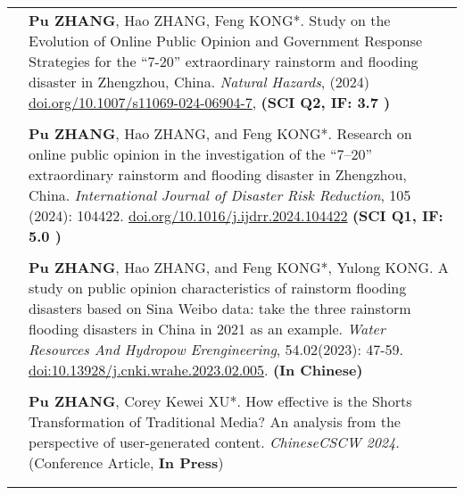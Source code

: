\documentclass[letterpaper, 11pt]{article}
\begin{document}
\begin{longtable}{p{1.3in}p{4.8in}}

\nohyphens{\color{RoyalBlue}{Publications}} 

& \textbf{Pu ZHANG}, Hao ZHANG, Feng KONG*. Study on the Evolution of Online Public Opinion and Government Response Strategies for the “7-20” extraordinary rainstorm and flooding disaster in Zhengzhou, China. \textit{Natural Hazards}, (2024) \href{https://doi.org/10.1007/s11069-024-06904-7}{doi.org/10.1007/s11069-024-06904-7}, \bf(SCI Q2, IF: 3.7 )\\
&\\
& \textbf{Pu ZHANG}, Hao ZHANG, and Feng KONG*. Research on online public opinion in the investigation of the “7–20” extraordinary rainstorm and flooding disaster in Zhengzhou, China. \textit{International Journal of Disaster Risk Reduction}, { 105 (2024): 104422.} \href{https://doi.org/10.1016/j.ijdrr.2024.104422}{doi.org/10.1016/j.ijdrr.2024.104422} \bf(SCI Q1, IF: 5.0 )\\
&\\
& \textbf{Pu ZHANG}, Hao ZHANG, and Feng KONG*, Yulong KONG. {A study on public opinion characteristics of rainstorm flooding disasters based on Sina Weibo data: take the three rainstorm flooding disasters in China in 2021 as an example}. \textit{Water Resources And Hydropow Erengineering}, {54.02(2023): 47-59}. \href{https://doi.org/10.13928/j.cnki.wrahe.2023.02.005}{doi:10.13928/j.cnki.wrahe.2023.02.005}. \bf(In Chinese)\\
&\\
& \textbf{Pu ZHANG}, Corey Kewei XU*. How effective is the Shorts Transformation of Traditional Media? An analysis from the perspective of user-generated content. \textit{ChineseCSCW 2024}. (Conference Article, \textbf{In Press})\\
&\\
\nohyphens{\color{RoyalBlue}{Working Papers}} 


\end{longtable}
\end{document}
